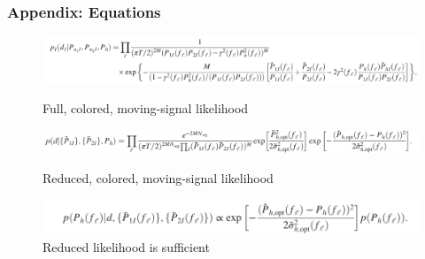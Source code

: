 \documentclass[10pt]{beamer}
\begin{document}
\begin{frame}
  \frametitle{Appendix: Equations}
  \begin{figure}
    \includegraphics[scale=.25]{full.png}
    \caption{Full, colored, moving-signal likelihood}
    \includegraphics[scale=.25]{reduced.png}
    \caption{Reduced, colored, moving-signal likelihood}
    \includegraphics[scale=.25]{propto.png}
    \caption{Reduced likelihood is sufficient}
  \end{figure}
\end{frame}
\end{document}
